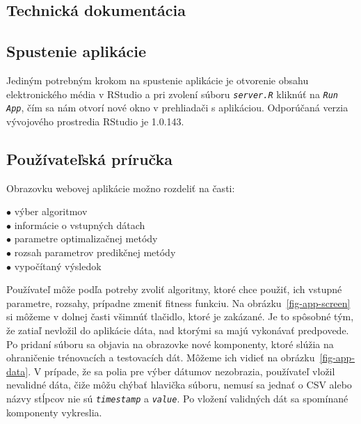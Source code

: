 \documentclass[a4paper,slovak,12pt,appendix]{article}
\begin{document}

\begin{appendices}
\newpage
\section{Technická dokumentácia}
\label{documentation}

\subsection{Spustenie aplikácie}
Jediným potrebným krokom na spustenie aplikácie je otvorenie obsahu
elektronického média v RStudio a pri zvolení súboru \texttt{\textit{server.R}} kliknúť na
\texttt{\textit{Run App}}, čím sa nám otvorí nové okno v prehliadači s aplikáciou. Odporúčaná
verzia vývojového prostredia RStudio je 1.0.143.

\subsection{Používateľská príručka}
Obrazovku webovej aplikácie možno rozdeliť na časti:
\begin{description}
  \item[$\bullet$ výber algoritmov]
  \item[$\bullet$ informácie o vstupných dátach]
  \item[$\bullet$ parametre optimalizačnej metódy]
  \item[$\bullet$ rozsah parametrov predikčnej metódy]
  \item[$\bullet$ vypočítaný výsledok]
\end{description}
Používateľ môže podľa potreby zvoliť algoritmy, ktoré chce použiť, ich vstupné
parametre, rozsahy, prípadne zmeniť fitness funkciu. Na obrázku~\ref{fig-app-screen}
si môžeme v dolnej časti všimnúť tlačidlo, ktoré je zakázané. Je to spôsobné
tým, že zatiaľ nevložil do aplikácie dáta, nad ktorými sa majú vykonávať
predpovede. Po pridaní súboru sa objavia na obrazovke nové komponenty, ktoré
slúžia na ohraničenie trénovacích a testovacích dát. Môžeme ich vidieť na
obrázku~\ref{fig-app-data}. V prípade, že sa polia pre výber dátumov nezobrazia,
používateľ vložil nevalidné dáta, čiže môžu chýbať hlavička súboru, nemusí sa
jednať o CSV alebo názvy stĺpcov nie sú \texttt{\textit{timestamp}} a \texttt{\textit{value}}. Po vložení
validných dát sa spomínané komponenty vykreslia.


\end{appendices}
\end{document}
